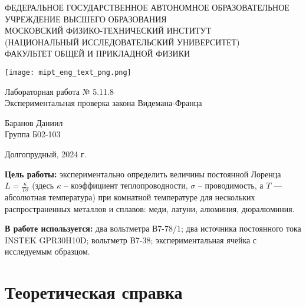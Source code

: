 \documentclass[a4paper,12pt]{article} %
\begin{document}
\begin{center}
	\footnotesize{ФЕДЕРАЛЬНОЕ ГОСУДАРСТВЕННОЕ АВТОНОМНОЕ ОБРАЗОВАТЕЛЬНОЕ 			УЧРЕЖДЕНИЕ ВЫСШЕГО ОБРАЗОВАНИЯ}\\
	\footnotesize{МОСКОВСКИЙ ФИЗИКО-ТЕХНИЧЕСКИЙ ИНСТИТУТ\\(НАЦИОНАЛЬНЫЙ 			ИССЛЕДОВАТЕЛЬСКИЙ УНИВЕРСИТЕТ)}\\
	\footnotesize{ФАКУЛЬТЕТ ОБЩЕЙ И ПРИКЛАДНОЙ ФИЗИКИ\\}
	\hfill \break
	\hfill \break
	\hfill \break
	\hfill \break
\end{center}


\begin{figure*}[h]
    \centering
    \texttt{[image: mipt\_eng\_text\_png.png]}
    \label{fig:my_label}
\end{figure*}


\begin{center}   
    \hfill \break
	\hfill \break
	\hfill \break
	\large{Лабораторная работа № 5.11.8\\ \hfill \break\Large{Экспериментальная проверка закона Видемана-Франца}}\\
	\hfill \break
	\hfill \break
	\hfill \break
	\hfill \break
	\begin{flushright}
		Баранов Даниил\\
		Группа Б02-103
	\end{flushright}
	\hfill \break
	\hfill \break
	\hfill \break
\end{center}
\hfill \break
\hfill \break
\hfill \break
\begin{center}
	Долгопрудный, 2024 г.
\end{center}
\thispagestyle{empty}

\newpage

\textbf{Цель работы:} экспериментально определить величины постоянной Лоренца $\displaystyle L=\frac{\kappa}{T\sigma}$ (здесь $\kappa$ – коэффициент теплопроводности, $\sigma$ – проводимость, а $T$ —
абсолютная температура) при комнатной температуре для нескольких распространенных металлов и сплавов: меди, латуни, алюминия, дюралюминия.

\textbf{В работе используется:} два вольтметра В7-78/1; два источника постоянного тока INSTEK GPR30H10D; 
вольтметр В7-38; экспериментальная ячейка с исследуемым образцом.

\section{Теоретическая справка}
\end{document}
